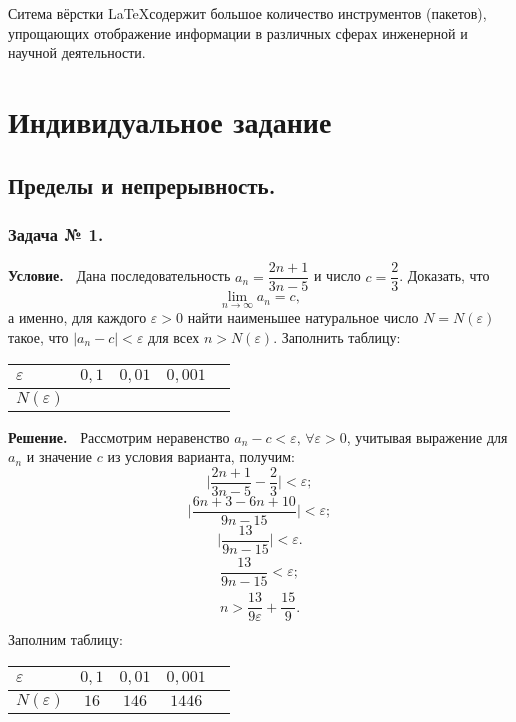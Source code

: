 \documentclass[12pt]{article}
\newcommand{\eps}{\varepsilon}
\begin{document}
Ситема вёрстки \LaTeX содержит большое количество инструментов (пакетов), упрощающих отображение информации в различных 
сферах инженерной и научной деятельности. 

\newpage
\section{Индивидуальное задание}
\subsection{Пределы и непрерывность.}
\subsubsection*{\center Задача № 1.}
{\bf Условие.~}
Дана последовательность $a_{n}=\dfrac{2n+1}{3n-5}$ и число $c=\dfrac{2}{3}$.
Доказать, что $$\lim\limits_{n\rightarrow\infty}a_n=c,$$
а именно, для каждого $\eps>0$ найти наименьшее натуральное число $N{=}N(\eps)$ такое, что $|a_{n}-c|<\eps$ для всех $n>N(\eps)$.
Заполнить таблицу:
\begin{center}
\begin{tabular}{ | p{25pt} | c | c | c | c |}
\hline
$\varepsilon$& $0{,}1$ & $0{,}01$ & $0{,}001$ \\
\hline
$N(\varepsilon)$ &   &   &\\
\hline
\end{tabular}    
\end{center}
{\bf Решение.~}
Рассмотрим неравенство $a_n-c<\eps,\,\forall\eps>0$, учитывая выражение для $a_n$ и значение $c$ из условия варианта,
получим:
$$
\biggl|\dfrac{2n+1}{3n-5}-\frac{2}{3}\biggr| < \eps ;
$$
$$
\biggl|\frac{6n+3-6n+10}{9n-15}\biggr| < \eps ;
$$
$$
\biggl|\frac{13}{9n-15}\biggr| < \eps .
$$
$$
\begin{array}{c}
\dfrac{13}{9n-15} < \eps ;             \\[8pt]
n > \dfrac{13}{9\eps} + \dfrac{15}{9} . \\[8pt]
\end{array}
$$
\center Заполним таблицу:
\begin{center}
\begin{tabular}{ | p{25pt} | c | c | c | c |}
\hline
$\varepsilon$& $0{,}1$ & $0{,}01$ & $0{,}001$ \\
\hline
$N(\varepsilon)$& $16$ & $146$ & $1446$\\
\hline
\end{tabular}
\end{center} 
\end{document}
